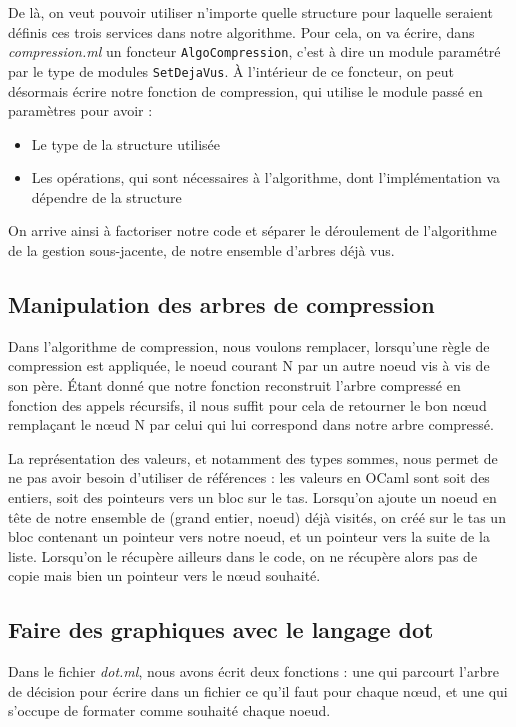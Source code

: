 \documentclass[12pt,a4paper]{article}
\begin{document}
De là, on veut pouvoir utiliser n'importe quelle structure pour laquelle seraient définis ces trois services dans notre algorithme. Pour cela, on va écrire, dans \textit{compression.ml} un foncteur \texttt{AlgoCompression}, c'est à dire un module paramétré par le type de modules \texttt{SetDejaVus}. À l'intérieur de ce foncteur, on peut désormais écrire notre fonction de compression, qui utilise le module passé en paramètres pour avoir :
\begin{itemize}
\item Le type de la structure utilisée
\item Les opérations, qui sont nécessaires à l'algorithme, dont l'implémentation va dépendre de la structure
\end{itemize}


On arrive ainsi à factoriser notre code et séparer le déroulement de l'algorithme de la gestion sous-jacente, de notre ensemble d'arbres déjà vus.

\subsection{Manipulation des arbres de compression}

Dans l'algorithme de compression, nous voulons remplacer, lorsqu'une règle de compression est appliquée, le noeud courant N par un autre noeud vis à vis de son père. Étant donné que notre fonction reconstruit l'arbre compressé en fonction des appels récursifs, il nous suffit pour cela de retourner le bon nœud remplaçant le nœud N par celui qui lui correspond dans notre arbre compressé.

La représentation des valeurs, et notamment des types sommes, nous permet de ne pas avoir besoin d'utiliser de références : les valeurs en OCaml sont soit des entiers, soit des pointeurs vers un bloc sur le tas. Lorsqu'on ajoute un noeud en tête de notre ensemble de (grand entier, noeud) déjà visités, on créé sur le tas un bloc contenant un pointeur vers notre noeud, et un pointeur vers la suite de la liste. Lorsqu'on le récupère ailleurs dans le code, on ne récupère alors pas de copie mais bien un pointeur vers le nœud souhaité. 


\subsection{Faire des graphiques avec le langage dot}

Dans le fichier \textit{dot.ml}, nous avons écrit deux fonctions : une qui parcourt l'arbre de décision pour écrire dans un fichier ce qu'il faut pour chaque nœud, et une qui s'occupe de formater comme souhaité chaque noeud.
\end{document}
